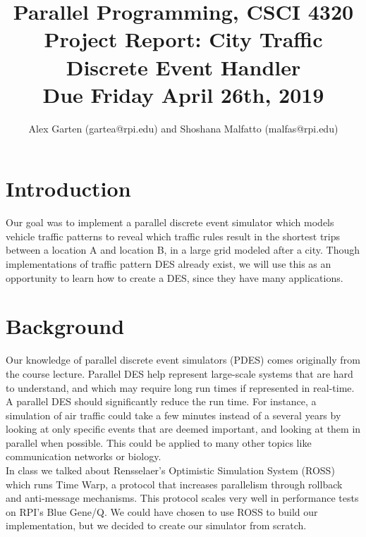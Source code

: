 \documentclass[10pt]{article}
\title{Parallel Programming, CSCI 4320\\
Project Report: City Traffic Discrete Event Handler\\
Due Friday April 26th, 2019}
\author{Alex Garten (gartea@rpi.edu) and Shoshana Malfatto (malfas@rpi.edu)}
\date{}
\newcommand\tab[1][0.75cm]{\hspace*{#1}}
\begin{document}
\maketitle

\begin{multicols}{2}

\section{Introduction}
Our goal was to implement a parallel discrete event simulator which models vehicle traffic patterns to reveal which traffic rules result in the shortest trips between a location A and location B, in a large grid modeled after a city. Though implementations of traffic pattern DES already exist, we will use this as an opportunity to learn how to create a DES, since they have many applications.

\section{Background}
Our knowledge of parallel discrete event simulators (PDES) comes originally from the course lecture. Parallel DES help represent large-scale systems that are hard to understand, and which may require long run times if represented in real-time. A parallel DES should significantly reduce the run time. For instance, a simulation of air traffic could take a few minutes instead of a several years by looking at only specific events that are deemed important, and looking at them in parallel when possible. This could be applied to many other topics like communication networks or biology.\\
\tab In class we talked about Rensselaer’s Optimistic Simulation System (ROSS) which runs Time Warp, a protocol that increases parallelism through rollback and anti-message mechanisms. This protocol scales very well in performance tests on RPI's Blue Gene/Q. We could have chosen to use ROSS to build our implementation, but we decided to create our simulator from scratch.


\end{multicols}
\end{document}
